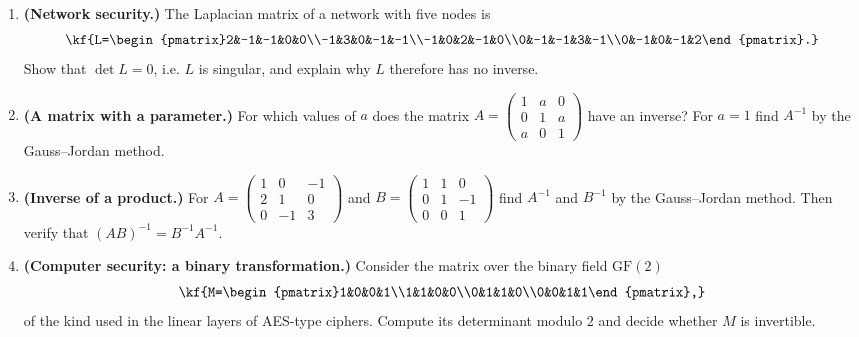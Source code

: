 \begin{enumerate}[label=\arabic*.,]
so as to reduce its left $3\times 3$ block to the identity, and write down the
systematic generator matrix $G'=(I_3\,|\,P)$ (all arithmetic modulo $2$).
\item \textbf{(Network security.)} The Laplacian matrix of a network with five
nodes is
\[\kf{L=\begin{pmatrix}2&-1&-1&0&0\\-1&3&0&-1&-1\\-1&0&2&-1&0\\0&-1&-1&3&-1\\0&-1&0&-1&2\end{pmatrix}.}\]
Show that $\det L=0$, i.e. $L$ is singular, and explain why $L$ therefore has no
inverse.
\item \textbf{(A matrix with a parameter.)} For which values of $a$ does the matrix
$A=\begin{pmatrix}1&a&0\\0&1&a\\a&0&1\end{pmatrix}$ have an inverse? For $a=1$
find $A^{-1}$ by the Gauss–Jordan method.
\item \textbf{(Inverse of a product.)} For $A=\begin{pmatrix}1&0&-1\\2&1&0\\0&-1&3\end{pmatrix}$
and $B=\begin{pmatrix}1&1&0\\0&1&-1\\0&0&1\end{pmatrix}$ find $A^{-1}$ and
$B^{-1}$ by the Gauss–Jordan method. Then verify that $(AB)^{-1}=B^{-1}A^{-1}$.
\item \textbf{(Computer security: a binary transformation.)} Consider the matrix
over the binary field $\mathrm{GF}(2)$
\[\kf{M=\begin{pmatrix}1&0&0&1\\1&1&0&0\\0&1&1&0\\0&0&1&1\end{pmatrix},}\]
of the kind used in the linear layers of AES-type ciphers. Compute its determinant
modulo $2$ and decide whether $M$ is invertible.
\end{enumerate}
